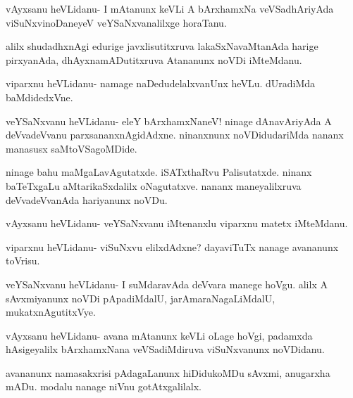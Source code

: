 \documentclass{article}
\begin{document}
\begin{mng}%
vAyxsanu heVLidanu- I mAtanunx keVLi A bArxhamxNa veVSadhAriyAda 
viSuNxvinoDaneyeV veYSaNxvanalilxge horaTanu.
\end{mng}

\begin{mng}%
alilx shudadhxnAgi edurige javxlisutitxruva lakaSxNavaMtanAda
harige pirxyanAda, dhAyxnamADutitxruva Atananunx noVDi iMteMdanu.
\end{mng}

\begin{mng}%
viparxnu heVLidanu- namage naDedudelalxvanUnx heVLu. dUradiMda
baMdidedxVne.
\end{mng}

\begin{mng}%
veYSaNxvanu heVLidanu- eleY bArxhamxNaneV! ninage dAnavAriyAda 
A deVvadeVvanu parxsananxnAgidAdxne. ninanxnunx noVDidudariMda nananx
manasusx saMtoVSagoMDide.
\end{mng}

\begin{mng}%
ninage bahu maMgaLavAgutatxde. iSATxthaRvu Palisutatxde. ninanx
baTeTxgaLu aMtarikaSxdalilx oNagutatxve. nananx maneyalilxruva deVvadeVvanAda hariyanunx
noVDu.
\end{mng}

\begin{mng}%
vAyxsanu heVLidanu- veYSaNxvanu iMtenanxlu viparxnu matetx
iMteMdanu.
\end{mng}

\begin{mng}%
viparxnu heVLidanu- viSuNxvu elilxdAdxne? dayaviTuTx nanage
avananunx toVrisu.
\end{mng}

\begin{mng}%
veYSaNxvanu heVLidanu- I suMdaravAda deVvara manege hoVgu.
alilx A sAvxmiyanunx noVDi pApadiMdalU, jarAmaraNagaLiMdalU, mukatxnAgutitxVye.
\end{mng}

\begin{mng}%
vAyxsanu heVLidanu- avana mAtanunx keVLi oLage hoVgi,
padamxda hAsigeyalilx bArxhamxNana veVSadiMdiruva viSuNxvanunx noVDidanu.
\end{mng}

\begin{mng}%
avananunx namasakxrisi pAdagaLanunx hiDidukoMDu sAvxmi,
anugarxha mADu. modalu nanage niVnu gotAtxgalilalx.
\end{mng}
\end{document}
